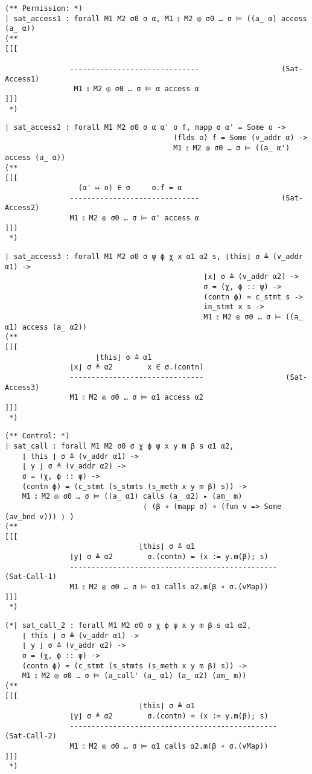 \documentclass[12pt]{article}
\begin{document}
\begin{verbatim}
(** Permission: *)
| sat_access1 : forall M1 M2 σ0 σ α, M1 ⦂ M2 ◎ σ0 … σ ⊨ ((a_ α) access (a_ α))
(**
[[[
                
               ------------------------------                   (Sat-Access1)
                M1 ⦂ M2 ◎ σ0 … σ ⊨ α access α
]]]
 *)
\end{verbatim}
\begin{verbatim}
| sat_access2 : forall M1 M2 σ0 σ α α' o f, mapp σ α' = Some o ->
                                       (flds o) f = Some (v_addr α) ->
                                       M1 ⦂ M2 ◎ σ0 … σ ⊨ ((a_ α') access (a_ α))
(**
[[[
                 (α' ↦ o) ∈ σ     o.f = α
               ------------------------------                   (Sat-Access2)
               M1 ⦂ M2 ◎ σ0 … σ ⊨ α' access α
]]]
 *)
\end{verbatim}
\begin{verbatim}
| sat_access3 : forall M1 M2 σ0 σ ψ ϕ χ x α1 α2 s, ⌊this⌋ σ ≜ (v_addr α1) ->
                                              ⌊x⌋ σ ≜ (v_addr α2) ->
                                              σ = (χ, ϕ :: ψ) ->
                                              (contn ϕ) = c_stmt s ->
                                              in_stmt x s ->
                                              M1 ⦂ M2 ◎ σ0 … σ ⊨ ((a_ α1) access (a_ α2))
(**
[[[
                     ⌊this⌋ σ ≜ α1
               ⌊x⌋ σ ≜ α2        x ∈ σ.(contn)
               -------------------------------                   (Sat-Access3)
               M1 ⦂ M2 ◎ σ0 … σ ⊨ α1 access α2
]]]
 *)
\end{verbatim}
\begin{verbatim}
(** Control: *)
| sat_call : forall M1 M2 σ0 σ χ ϕ ψ x y m β s α1 α2,
    ⌊ this ⌋ σ ≜ (v_addr α1) ->
    ⌊ y ⌋ σ ≜ (v_addr α2) ->
    σ = (χ, ϕ :: ψ) ->
    (contn ϕ) = (c_stmt (s_stmts (s_meth x y m β) s)) ->
    M1 ⦂ M2 ◎ σ0 … σ ⊨ ((a_ α1) calls (a_ α2) ▸ (am_ m)
                                ⟨ (β ∘ (mapp σ) ∘ (fun v => Some (av_bnd v))) ⟩ )
(**
[[[
                               ⌊this⌋ σ ≜ α1        
               ⌊y⌋ σ ≜ α2        σ.(contn) = (x := y.m(β); s)
               ------------------------------------------------                   (Sat-Call-1)
               M1 ⦂ M2 ◎ σ0 … σ ⊨ α1 calls α2.m(β ∘ σ.(vMap))
]]]
 *)
\end{verbatim}
\begin{verbatim}
(*| sat_call_2 : forall M1 M2 σ0 σ χ ϕ ψ x y m β s α1 α2,
    ⌊ this ⌋ σ ≜ (v_addr α1) ->
    ⌊ y ⌋ σ ≜ (v_addr α2) ->
    σ = (χ, ϕ :: ψ) ->
    (contn ϕ) = (c_stmt (s_stmts (s_meth x y m β) s)) ->
    M1 ⦂ M2 ◎ σ0 … σ ⊨ (a_call' (a_ α1) (a_ α2) (am_ m))
(**
[[[
                               ⌊this⌋ σ ≜ α1        
               ⌊y⌋ σ ≜ α2        σ.(contn) = (x := y.m(β); s)
               ------------------------------------------------                   (Sat-Call-2)
               M1 ⦂ M2 ◎ σ0 … σ ⊨ α1 calls α2.m(β ∘ σ.(vMap))
]]]
 *)
\end{verbatim}
\end{document}

